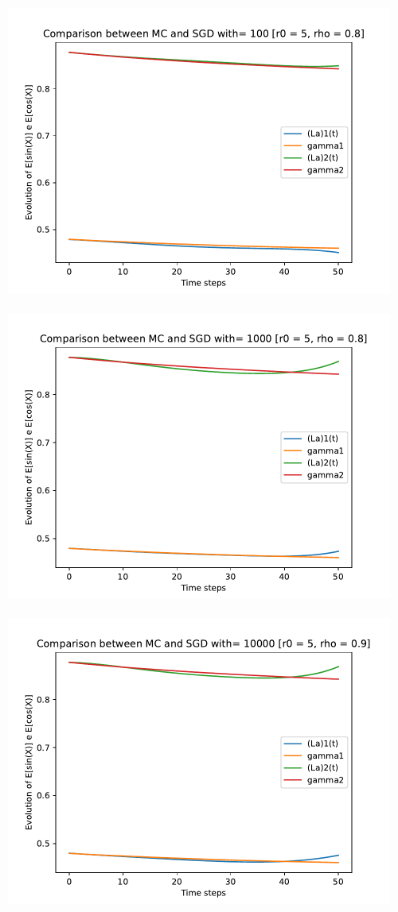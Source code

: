 \documentclass[a4paper,11pt,openright]{report}
\begin{document}
\begin{figure}[H]
\centering
\includegraphics[width=0.9\textwidth]{images/graphs T = 0.5/n = 5, M = 100 sine and cosine.pdf}
\end{figure}
\begin{figure}[H]
\centering
\includegraphics[width=0.9\textwidth]{images/graphs T = 0.5/n = 5, M = 1000 sine and cosine.pdf}
\end{figure}
\begin{figure}[H]
\centering
\includegraphics[width=0.9\textwidth]{images/graphs T = 0.5/n = 5, M = 10000 sine and cosine.pdf}
\end{figure}
\newpage
\end{document}
